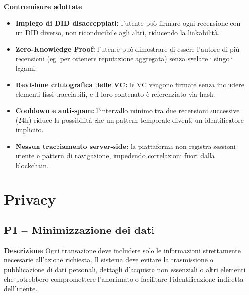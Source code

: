             \noindent \textbf{Contromisure adottate}
                \begin{itemize}
                    \item \textbf{Impiego di DID disaccoppiati:} l'utente può firmare ogni recensione con un DID diverso, non riconducibile agli altri, riducendo la linkabilità.
    
                    \item \textbf{Zero-Knowledge Proof:} l'utente può dimostrare di essere l'autore di più recensioni (eg. per ottenere reputazione aggregata) senza svelare i singoli legami.
    
                    \item \textbf{Revisione crittografica delle VC:} le VC vengono firmate senza includere elementi fissi tracciabili, e il loro contenuto è referenziato via hash.
    
                    \item \textbf{Cooldown e anti-spam:} l'intervallo minimo tra due recensioni successive (24h) riduce la possibilità che un pattern temporale diventi un identificatore implicito.
    
                    \item \textbf{Nessun tracciamento server-side:} la piattaforma non registra sessioni utente o pattern di navigazione, impedendo correlazioni fuori dalla blockchain.
                \end{itemize}

    \section{Privacy}
        \subsection{P1 – Minimizzazione dei dati}
            \noindent \textbf{Descrizione}
                Ogni transazione deve includere solo le informazioni strettamente necessarie all'azione richiesta. Il sistema deve evitare la trasmissione o pubblicazione di dati personali, dettagli d'acquisto non essenziali o altri elementi che potrebbero compromettere l'anonimato o facilitare l'identificazione indiretta dell'utente. \\

